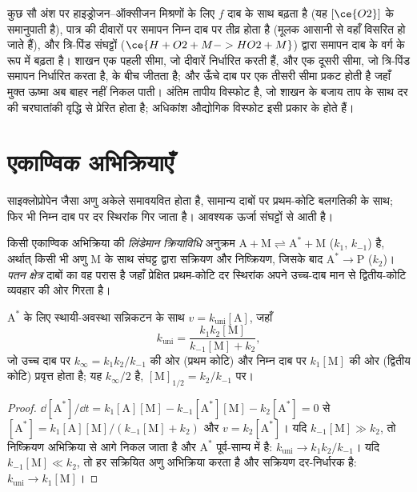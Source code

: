 कुछ सौ अंश पर हाइड्रोजन--ऑक्सीजन मिश्रणों के लिए $f$ दाब के साथ बढ़ता है
(यह $[\ce{O2}]$ के समानुपाती है), पात्र की दीवारों पर समापन
निम्न दाब पर तीव्र होता है (मूलक आसानी से वहाँ विसरित हो जाते हैं), और
त्रि-पिंड संघट्टों ($\ce{H + O2 + M -> HO2 + M}$) द्वारा समापन दाब के वर्ग के रूप में
बढ़ता है। शाखन एक पहली सीमा, जो दीवारें निर्धारित करती हैं, और एक
दूसरी सीमा, जो त्रि-पिंड समापन निर्धारित करता है, के बीच जीतता है; और ऊँचे दाब पर एक तीसरी
सीमा प्रकट होती है जहाँ मुक्त ऊष्मा अब बाहर नहीं निकल पाती। अंतिम
तापीय विस्फोट है, जो शाखन के बजाय ताप के साथ दर की चरघातांकी वृद्धि से
प्रेरित होता है; अधिकांश औद्योगिक विस्फोट इसी
प्रकार के होते हैं।

\section{एकाण्विक अभिक्रियाएँ}

साइक्लोप्रोपेन जैसा अणु अकेले समावयवित होता है, सामान्य दाबों पर प्रथम-कोटि
बलगतिकी के साथ; फिर भी निम्न दाब पर दर स्थिरांक गिर जाता है। आवश्यक
ऊर्जा संघट्टों से आती है।

\begin{definition}[लिंडेमान क्रियाविधि, पतन क्षेत्र]\label{def:b3:complex-kinetics:lindemann}
किसी एकाण्विक अभिक्रिया की \emph{लिंडेमान क्रियाविधि}
अनुक्रम $\mathrm{A + M \rightleftharpoons A^* + M}$ ($k_1$, $k_{-1}$) है, अर्थात् किसी भी अणु M के साथ संघट्ट द्वारा
सक्रियण और निष्क्रियण, जिसके बाद $\mathrm{A^* \to P}$ ($k_2$)।
\emph{पतन क्षेत्र} दाबों का वह परास है जहाँ
प्रेक्षित प्रथम-कोटि दर स्थिरांक अपने उच्च-दाब मान से
द्वितीय-कोटि व्यवहार की ओर गिरता है।
\end{definition}

\begin{theorem}[लिंडेमान दर स्थिरांक]\label{thm:b3:complex-kinetics:lindemann}
$\mathrm{A^*}$ के लिए स्थायी-अवस्था सन्निकटन के साथ $v = k_{\mathrm{uni}}[\mathrm A]$, जहाँ
\[
  k_{\mathrm{uni}} = \frac{k_1k_2[\mathrm M]}{k_{-1}[\mathrm M] + k_2},
\]
जो उच्च दाब पर $k_\infty = k_1k_2/k_{-1}$ की ओर (प्रथम कोटि) और निम्न दाब पर $k_1[\mathrm M]$ की ओर
(द्वितीय कोटि) प्रवृत्त होता है; यह $k_\infty/2$ है, $[\mathrm M]_{1/2} = k_2/k_{-1}$ पर।
\end{theorem}

\begin{proof}
$\dd[\mathrm{A^*}]/\dd t = k_1[\mathrm A][\mathrm M] - k_{-1}[\mathrm{A^*}][\mathrm M] - k_2[\mathrm{A^*}] = 0$ से $[\mathrm{A^*}] =
k_1[\mathrm A][\mathrm M]/(k_{-1}[\mathrm M] + k_2)$ और $v = k_2[\mathrm{A^*}]$। यदि $k_{-1}[\mathrm M] \gg k_2$, तो निष्क्रियण
अभिक्रिया से आगे निकल जाता है और $\mathrm{A^*}$ पूर्व-साम्य में है: $k_{\mathrm{uni}} \to k_1k_2/k_{-1}$। यदि $k_{-1}[\mathrm M]
\ll k_2$, तो हर सक्रियित अणु अभिक्रिया करता है और सक्रियण दर-निर्धारक है:
$k_{\mathrm{uni}} \to k_1[\mathrm M]$।
\end{proof}

